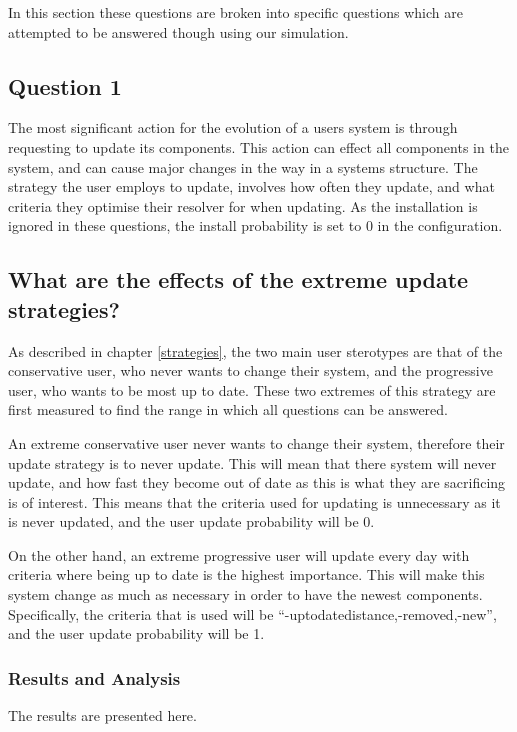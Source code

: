 In this section these questions are broken into specific questions which are attempted to be answered though using our simulation.

\subsection{Question 1}
The most significant action for the evolution of a users system is through requesting to update its components.
This action can effect all components in the system, and can cause major changes in the way in a systems structure.
The strategy the user employs to update, involves how often they update, and what criteria they optimise their resolver for when updating.
As the installation is ignored in these questions, the install probability is set to 0 in the configuration.


\subsection{What are the effects of the extreme update strategies?}
As described in chapter \ref{strategies}, the two main user sterotypes are that of the conservative user, who never wants to change their system,
and the progressive user, who wants to be most up to date.
These two extremes of this strategy are first measured to find the range in which all questions can be answered.

An extreme conservative user never wants to change their system, therefore their update strategy is to never update.
This will mean that there system will never update, and how fast they become out of date as this is what they are sacrificing is of interest.
This means that the criteria used for updating is unnecessary as it is never updated, and the user update probability will be 0.

On the other hand, an extreme progressive user will update every day with criteria where being up to date is the highest importance.
This will make this system change as much as necessary in order to have the newest components.
Specifically, the criteria that is used will be ``-uptodatedistance,-removed,-new'', and the user update probability will be 1.

\subsubsection{Results and Analysis}
The results are presented here.

